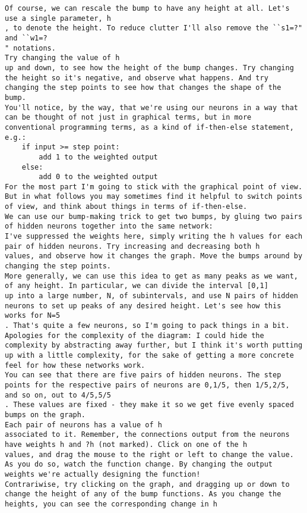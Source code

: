 \begin{lstlisting}
Of course, we can rescale the bump to have any height at all. Let's use a single parameter, h
, to denote the height. To reduce clutter I'll also remove the ``s1=?" and ``w1=?
" notations.
Try changing the value of h
up and down, to see how the height of the bump changes. Try changing the height so it's negative, and observe what happens. And try changing the step points to see how that changes the shape of the bump.
You'll notice, by the way, that we're using our neurons in a way that can be thought of not just in graphical terms, but in more conventional programming terms, as a kind of if-then-else statement, e.g.:
    if input >= step point:
        add 1 to the weighted output
    else:
        add 0 to the weighted output
For the most part I'm going to stick with the graphical point of view. But in what follows you may sometimes find it helpful to switch points of view, and think about things in terms of if-then-else.
We can use our bump-making trick to get two bumps, by gluing two pairs of hidden neurons together into the same network:
I've suppressed the weights here, simply writing the h values for each pair of hidden neurons. Try increasing and decreasing both h
values, and observe how it changes the graph. Move the bumps around by changing the step points.
More generally, we can use this idea to get as many peaks as we want, of any height. In particular, we can divide the interval [0,1]
up into a large number, N, of subintervals, and use N pairs of hidden neurons to set up peaks of any desired height. Let's see how this works for N=5
. That's quite a few neurons, so I'm going to pack things in a bit. Apologies for the complexity of the diagram: I could hide the complexity by abstracting away further, but I think it's worth putting up with a little complexity, for the sake of getting a more concrete feel for how these networks work.
You can see that there are five pairs of hidden neurons. The step points for the respective pairs of neurons are 0,1/5, then 1/5,2/5, and so on, out to 4/5,5/5
. These values are fixed - they make it so we get five evenly spaced bumps on the graph.
Each pair of neurons has a value of h
associated to it. Remember, the connections output from the neurons have weights h and ?h (not marked). Click on one of the h
values, and drag the mouse to the right or left to change the value. As you do so, watch the function change. By changing the output weights we're actually designing the function!
Contrariwise, try clicking on the graph, and dragging up or down to change the height of any of the bump functions. As you change the heights, you can see the corresponding change in h

\end{lstlisting}
